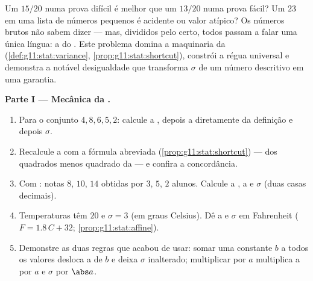 \begin{problem}
\label{pb:g11:stat:1}
Um $15/20$ numa prova difícil é melhor que um $13/20$ numa prova
fácil? Um $23$ em uma lista de números pequenos é acidente ou
valor atípico? Os números brutos não sabem dizer --- mas,
divididos pelo  certo, todos passam a falar uma
única língua: a do \emph{}. Este problema domina a
maquinaria da  (\cref{def:g11:stat:variance},
\cref{prop:g11:stat:shortcut}), constrói a régua universal e
demonstra a notável desigualdade que transforma $\sigma$ de um
número descritivo em uma garantia.

\medskip
\noindent\textbf{Parte I --- Mecânica da .}
\begin{enumerate}
  \item Para o conjunto $4, 8, 6, 5, 2$: calcule a , depois
        a  diretamente da definição e depois $\sigma$.
  \item Recalcule a  com a fórmula abreviada
        (\cref{prop:g11:stat:shortcut}) ---  dos quadrados
        menos quadrado da  --- e confira a concordância.
  \item Com : notas $8$, $10$, $14$ obtidas por $3$,
        $5$, $2$ alunos. Calcule a , a  e $\sigma$
        (duas casas decimais).
  \item Temperaturas têm  $20$ e $\sigma = 3$ (em graus
        Celsius). Dê a  e $\sigma$ em Fahrenheit
        ($F = 1.8\,C + 32$; \cref{prop:g11:stat:affine}).
  \item Demonstre as duas regras que acabou de usar: somar uma
        constante $b$ a todos os valores desloca a  de $b$ e
        deixa $\sigma$ inalterado; multiplicar por $a$ multiplica
        a  por $a$ e $\sigma$ por $\abs a$.
\end{enumerate}


\end{problem}
